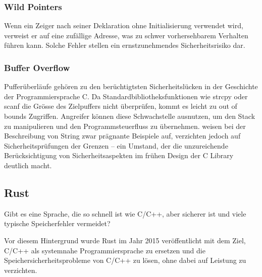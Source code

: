 \subsubsection{Wild Pointers}
\label{sec:Wild Pointers}
Wenn ein Zeiger nach seiner Deklaration ohne Initialisierung verwendet wird, verweist 
er auf eine zufällige Adresse, was zu schwer vorhersehbarem Verhalten führen kann. 
Solche Fehler stellen ein ernstzunehmendes Sicherheitsrisiko dar.
\begin{figure}[htp]
    \centering
    
    \label{fig:wild_pointer_in_c}
\end{figure}

\subsubsection{Buffer Overflow}
\label{sec:Buffer Overflow}
Pufferüberläufe gehören zu den berüchtigtsten Sicherheitslücken in der Geschichte 
der Programmiersprache C. Da Standardbibliotheksfunktionen wie strcpy oder scanf 
die Grösse des Zielpuffers nicht überprüfen, kommt es leicht zu out of bounds Zugriffen. 
Angreifer können diese Schwachstelle ausnutzen, um den Stack zu manipulieren und den 
Programmsteuerfluss zu übernehmen\autocite{SmashingtheStackforFunandProfit}. \autocite{TheCProgrammingLaunguage}weisen 
bei der Beschreibung von String zwar prägnante Beispiele auf, verzichten jedoch auf 
Sicherheitsprüfungen der Grenzen – ein Umstand, der die unzureichende Berücksichtigung 
von Sicherheitsaspekten im frühen Design der C Library deutlich macht.
\begin{figure}[htp]
    \centering
    
    \label{fig:wild_pointer_in_c}
\end{figure}

\subsection{Rust}
\label{sec:Rust}
Gibt es eine Sprache, die so schnell ist wie C/C++, aber sicherer ist und 
viele typische Speicherfehler vermeidet?

Vor diesem Hintergrund wurde Rust im Jahr 2015 veröffentlicht mit dem Ziel, 
C/C++ als systemnahe Programmiersprache zu ersetzen und die Speichersicherheitsprobleme 
von C/C++ zu lösen, ohne dabei auf Leistung zu verzichten.

